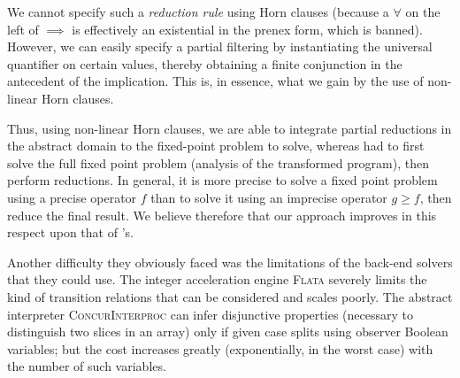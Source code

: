 \documentclass[a4paper]{article}
\newcommand{\soft}[1]{\textsc{#1}}
\theoremstyle{definition}
\theoremstyle{plain}
\begin{document}
We cannot specify such a \emph{reduction rule} using Horn clauses (because a $\forall$ on the left of $\implies$ is effectively an existential in the prenex form, which is banned).
However, we can easily specify a partial filtering by instantiating the universal quantifier on certain values, thereby obtaining a finite conjunction in the antecedent of the implication.
This is, in essence, what we gain by the use of non-linear Horn clauses.

Thus, using non-linear Horn clauses, we are able to integrate partial reductions in the abstract domain to the fixed-point problem to solve, whereas \citet[Sec.~5.5]{Monniaux_Alberti_SAS2015} had to first solve the full fixed point problem (analysis of the transformed program), then perform reductions.
In general, it is more precise to solve a fixed point problem using a precise operator $f$ than to solve it using an imprecise operator $g \geq f$, then reduce the final result.
We believe therefore that our approach improves in this respect upon that of \citeauthor{Monniaux_Alberti_SAS2015}'s.

Another difficulty they obviously faced was the limitations of the back-end solvers that they could use. The integer acceleration engine \soft{Flata} severely limits the kind of transition relations that can be considered and scales poorly.
The abstract interpreter \soft{ConcurInterproc} can infer disjunctive properties (necessary to distinguish two slices in an array) only if given case splits using observer Boolean variables; but the cost increases greatly (exponentially, in the worst case) with the number of such variables.
\end{document}
